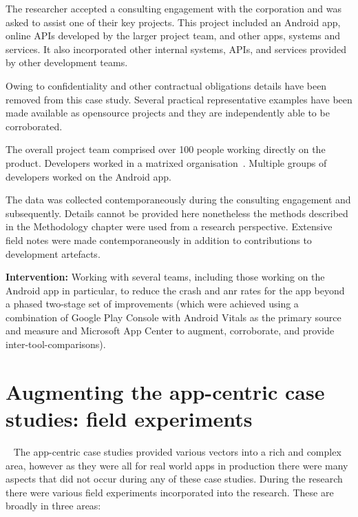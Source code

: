 The researcher accepted a consulting engagement with the corporation and was asked to assist one of their key projects. This project included an Android app, online APIs developed by the larger project team, and other apps, systems and services. It also incorporated other internal systems, APIs, and services provided by other development teams. 

Owing to confidentiality and other contractual obligations details have been removed from this case study. Several practical representative examples have been made available as opensource projects and they are independently able to be corroborated.

The overall project team comprised over 100 people working directly on the product. Developers worked in a matrixed organisation~. Multiple groups of developers worked on the Android app. 

The data was collected contemporaneously during the consulting engagement and subsequently. Details cannot be provided here nonetheless the methods described in the Methodology chapter were used from a research perspective. Extensive field notes were made contemporaneously in addition to contributions to development artefacts. 

\textbf{Intervention:} 
Working with several teams, including those working on the Android app in particular, to reduce the crash and \acrshort{anr} rates for the app beyond a phased two-stage set of improvements (which were achieved using a combination of Google Play Console with Android Vitals as the primary source and measure and Microsoft App Center to augment, corroborate, and provide inter-tool-comparisons).





\section{Augmenting the app-centric case studies: field experiments}~\label{section-field-experiments-to-augment-app-centric-case-studies}
The app-centric case studies provided various vectors into a rich and complex area, however as they were all for real world apps in production there were many aspects that did not occur during any of these case studies. During the research there were various field experiments incorporated into the research. These are broadly in three areas:


